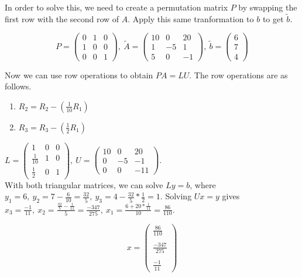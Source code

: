 \documentclass{report}
\begin{document}
In order to solve this, we need to create a permutation matrix $P$ by swapping the first row with the second row of $A$. 
Apply this same tranformation to $b$ to get $\tilde{b}$.

$$ P = \begin{pmatrix} 0 & 1 & 0 \\ 1 & 0 & 0 \\ 0 & 0 & 1 \end{pmatrix}, \ 
\tilde{A} = \begin{pmatrix} 10 & 0 & 20 \\ 1 & -5 & 1 \\ 5 & 0 & -1 \end{pmatrix}, \ 
\tilde{b} = \begin{pmatrix} 6 \\ 7 \\ 4 \end{pmatrix}$$

Now we can use row operations to obtain $PA=LU$. The row operations are as follows.

\begin{enumerate}
    \item $R_2 = R_2 - (\frac{1}{10} R_1)$
    \item $R_3 = R_3 - (\frac{1}{2} R_1)$
\end{enumerate}

$L = \begin{pmatrix} 1 & 0 & 0 \\ \frac{1}{10} & 1 & 0 \\ \frac{1}{2} & 0 & 1 \end{pmatrix}, \ 
U = \begin{pmatrix} 10 & 0 & 20 \\ 0 & -5 & -1 \\ 0 & 0 & -11 \end{pmatrix}$. \\

\noindent With both triangular matrices, we can solve $Ly=b$, where $y_1 = 6, \ y_2 =7 - \frac{6}{10} = \frac{32}{5}, \ y_3 =4 -  \frac{32}{5} * \frac{1}{2} = 1$.
Solving $Ux=y$ gives $x_3 = \frac{-1}{11}, \ x_2 =\frac{\frac{32}{5} - \frac{1}{11}}{5} = \frac{-347}{275}, 
\ x_1 = \frac{6 + 20 * \frac{1}{11}}{10} = \frac{86}{110}$.

$$x = \begin{pmatrix} \frac{86}{110} \\\\ \frac{-347}{275} \\\\ \frac{-1}{11} \end{pmatrix}$$\\\\
\end{document}
